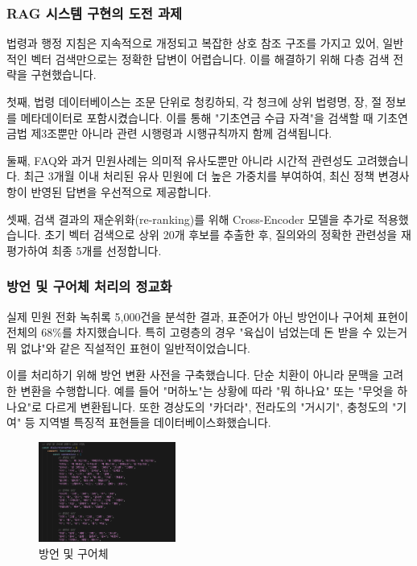 \subsubsection{RAG 시스템 구현의 도전 과제}

법령과 행정 지침은 지속적으로 개정되고 복잡한 상호 참조 구조를 가지고 있어, 일반적인 벡터 검색만으로는 정확한 답변이 어렵습니다. 이를 해결하기 위해 다층 검색 전략을 구현했습니다.

첫째, 법령 데이터베이스는 조문 단위로 청킹하되, 각 청크에 상위 법령명, 장, 절 정보를 메타데이터로 포함시켰습니다. 이를 통해 "기초연금 수급 자격"을 검색할 때 기초연금법 제3조뿐만 아니라 관련 시행령과 시행규칙까지 함께 검색됩니다.

둘째, FAQ와 과거 민원사례는 의미적 유사도뿐만 아니라 시간적 관련성도 고려했습니다. 최근 3개월 이내 처리된 유사 민원에 더 높은 가중치를 부여하여, 최신 정책 변경사항이 반영된 답변을 우선적으로 제공합니다.

셋째, 검색 결과의 재순위화(re-ranking)를 위해 Cross-Encoder 모델을 추가로 적용했습니다. 초기 벡터 검색으로 상위 20개 후보를 추출한 후, 질의와의 정확한 관련성을 재평가하여 최종 5개를 선정합니다.

\subsubsection{방언 및 구어체 처리의 정교화}

실제 민원 전화 녹취록 5,000건을 분석한 결과, 표준어가 아닌 방언이나 구어체 표현이 전체의 68\%를 차지했습니다. 특히 고령층의 경우 "육십이 넘었는데 돈 받을 수 있는거 뭐 없냐"와 같은 직설적인 표현이 일반적이었습니다.

이를 처리하기 위해 방언 변환 사전을 구축했습니다. 단순 치환이 아니라 문맥을 고려한 변환을 수행합니다. 예를 들어 "머하노"는 상황에 따라 "뭐 하나요" 또는 "무엇을 하나요"로 다르게 변환됩니다. 또한 경상도의 "카더라", 전라도의 "거시기", 충청도의 "기여" 등 지역별 특징적 표현들을 데이터베이스화했습니다.
 
\begin{figure}[H]
    \centering
    \includegraphics[width=0.4\textwidth]{1/ai_kiosk06.png}
    \caption{방언 및 구어체}
    \label{fig:Dialects and colloquialisms}
\end{figure}

